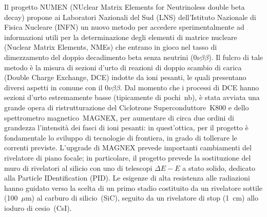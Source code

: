 \documentclass[10pt,foldmark,notumble]{leaflet}
\newcommand{\doppiobeta}{$ 0\nu\beta\beta$}
\begin{document}
Il progetto NUMEN (NUclear Matrix Elements for Neutrinoless double beta decay) propone ai Laboratori Nazionali del Sud (LNS) dell'Istituto Nazionale di Fisica Nucleare (INFN) un nuovo metodo per accedere sperimentalmente ad informazioni utili per la determinazione degli elementi di matrice nucleare (Nuclear Matrix Elements, NMEs) che entrano in gioco nel tasso di dimezzamento del doppio decadimento beta senza neutrini (\doppiobeta).
Il fulcro di tale metodo è la misura di sezioni d'urto di reazioni di doppio scambio di carica (Double Charge Exchange, DCE) indotte da ioni pesanti, le quali presentano diversi aspetti in comune con il \doppiobeta.
%
%
%
%
Dal momento che i processi di DCE hanno sezioni d'urto estremamente basse (tipicamente di pochi~nb), è stata avviata una grande opera di ristrutturazione del Ciclotrone Superconduttore~K800 e dello spettrometro magnetico~MAGNEX, per aumentare di circa due ordini di grandezza l'intensità dei fasci di ioni pesanti: in quest'ottica, per il progetto è fondamentale lo sviluppo di tecnologie di frontiera, in grado di tollerare le correnti previste.
L'upgrade di MAGNEX prevede importanti cambiamenti del rivelatore di piano focale; in particolare, il progetto prevede la sostituzione del muro di rivelatori al silicio con uno di telescopi $\Delta E - E$ a stato solido, dedicato alla Particle IDentification (PID). 
Le esigenze di alta resistenza alle radiazioni hanno guidato verso la scelta di un primo stadio costituito da un rivelatore sottile (100~$\mu$m) al carburo di silicio~(SiC), seguito da un rivelatore di stop (1~cm) allo ioduro di cesio~(CsI).
\end{document}
